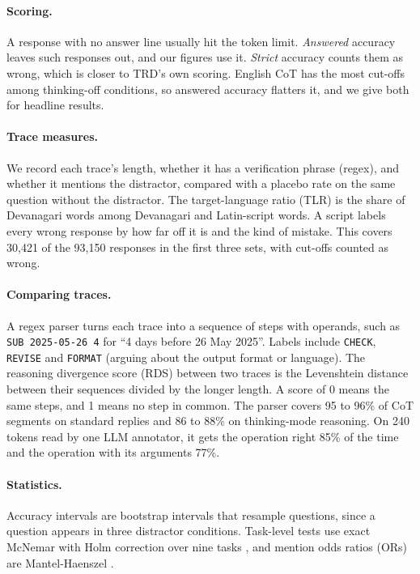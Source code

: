 \documentclass[11pt]{article}
\begin{document}
\paragraph{Scoring.}
A response with no answer line usually hit the token limit. \emph{Answered} accuracy leaves such responses out, and our figures use it. \emph{Strict} accuracy counts them as wrong, which is closer to TRD's own scoring. English CoT has the most cut-offs among thinking-off conditions, so answered accuracy flatters it, and we give both for headline results.

\paragraph{Trace measures.}
We record each trace's length, whether it has a verification phrase (regex), and whether it mentions the distractor, compared with a placebo rate on the same question without the distractor. The target-language ratio (TLR) is the share of Devanagari words among Devanagari and Latin-script words. A script labels every wrong response by how far off it is and the kind of mistake. This covers 30,421 of the 93,150 responses in the first three sets, with cut-offs counted as wrong.

\paragraph{Comparing traces.}
A regex parser turns each trace into a sequence of steps with operands, such as \texttt{SUB 2025-05-26 4} for ``4 days before 26 May 2025''. Labels include \texttt{CHECK}, \texttt{REVISE} and \texttt{FORMAT} (arguing about the output format or language). The reasoning divergence score (RDS) between two traces is the Levenshtein distance \citep{levenshtein1966binary} between their sequences divided by the longer length. A score of 0 means the same steps, and 1 means no step in common. The parser covers 95 to 96\% of CoT segments on standard replies and 86 to 88\% on thinking-mode reasoning. On 240 tokens read by one LLM annotator, it gets the operation right 85\% of the time and the operation with its arguments 77\%.

\paragraph{Statistics.}
Accuracy intervals are bootstrap intervals \citep{berg-kirkpatrick-etal-2012-empirical} that resample questions, since a question appears in three distractor conditions. Task-level tests use exact McNemar with Holm correction over nine tasks \citep{mcnemar-1947-note,holm-1979-simple,dror-etal-2018-hitchhikers}, and mention odds ratios (ORs) are Mantel-Haenszel \citep{mantel-haenszel-1959-statistical}.
\end{document}

